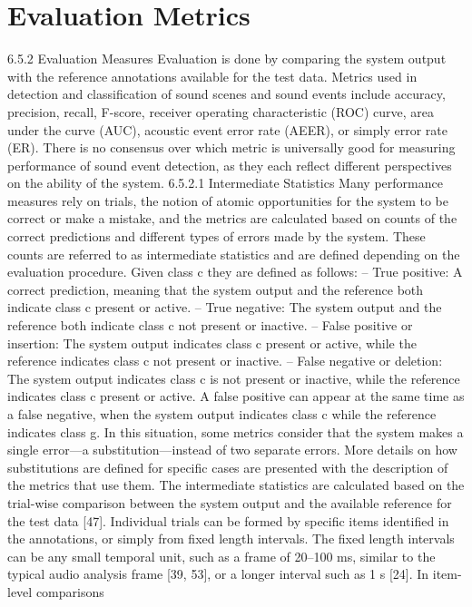 \section{Evaluation Metrics}

6.5.2 Evaluation Measures
Evaluation is done by comparing the system output with the reference annotations
available for the test data. Metrics used in detection and classification of sound
scenes and sound events include accuracy, precision, recall, F-score, receiver
operating characteristic (ROC) curve, area under the curve (AUC), acoustic event
error rate (AEER), or simply error rate (ER). There is no consensus over which
metric is universally good for measuring performance of sound event detection, as
they each reflect different perspectives on the ability of the system.
6.5.2.1 Intermediate Statistics
Many performance measures rely on trials, the notion of atomic opportunities for
the system to be correct or make a mistake, and the metrics are calculated based on
counts of the correct predictions and different types of errors made by the system.
These counts are referred to as intermediate statistics and are defined depending on
the evaluation procedure. Given class c they are defined as follows:
– True positive: A correct prediction, meaning that the system output and the
reference both indicate class c present or active.
– True negative: The system output and the reference both indicate class c not
present or inactive.
– False positive or insertion: The system output indicates class c present or active,
while the reference indicates class c not present or inactive.
– False negative or deletion: The system output indicates class c is not present or
inactive, while the reference indicates class c present or active.
A false positive can appear at the same time as a false negative, when the system
output indicates class c while the reference indicates class g. In this situation, some
metrics consider that the system makes a single error—a substitution—instead of
two separate errors. More details on how substitutions are defined for specific cases
are presented with the description of the metrics that use them.
The intermediate statistics are calculated based on the trial-wise comparison
between the system output and the available reference for the test data [47].
Individual trials can be formed by specific items identified in the annotations, or
simply from fixed length intervals. The fixed length intervals can be any small
temporal unit, such as a frame of 20–100 ms, similar to the typical audio analysis
frame [39, 53], or a longer interval such as 1 s [24]. In item-level comparisons
